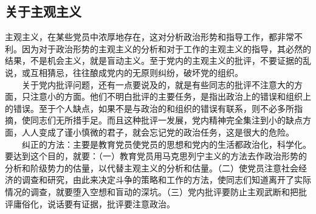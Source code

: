 \documentclass[cn,11pt,chinese]{elegantbook}
\def\myformat#1{\hfil\hfil #1}
\begin{document}
\subsection*{\myformat{关于主观主义}}
主观主义，在某些党员中浓厚地存在，这对分析政治形势和指导工作，都非常不利。因为对于政治形势的主观主义的分析和对于工作的主观主义的指导，其必然的结果，不是机会主义，就是盲动主义。至于党内的主观主义的批评，不要证据的乱说，或互相猜忌，往往酿成党内的无原则纠纷，破坏党的组织。\\
　　关于党内批评问题，还有一点要说及的，就是有些同志的批评不注意大的方面，只注意小的方面。他们不明白批评的主要任务，是指出政治上的错误和组织上的错误。至于个人缺点，如果不是与政治的和组织的错误有联系，则不必多所指摘，使同志们无所措手足。而且这种批评一发展，党内精神完全集注到小的缺点方面，人人变成了谨小慎微的君子，就会忘记党的政治任务，这是很大的危险。\\
　　纠正的方法：主要是教育党员使党员的思想和党内的生活都政治化，科学化。要达到这个目的，就要：（一）教育党员用马克思列宁主义的方法去作政治形势的分析和阶级势力的估量，以代替主观主义的分析和估量。（二）使党员注意社会经济的调查和研究，由此来决定斗争的策略和工作的方法，使同志们知道离开了实际情况的调查，就要堕入空想和盲动的深坑。（三）党内批评要防止主观武断和把批评庸俗化，说话要有证据，批评要注意政治。\\
\end{document}

